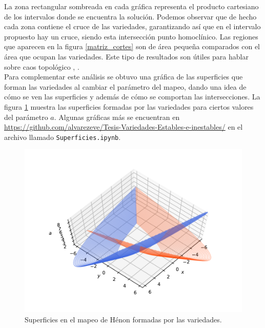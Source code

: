 


La zona rectangular sombreada en cada gráfica representa el producto cartesiano de los intervalos donde se encuentra la solución. Podemos observar que de hecho cada zona contiene el cruce de las variedades, garantizando así que en el intervalo propuesto hay un cruce, siendo esta intersección punto homoclínico. Las regiones que aparecen en la figura \ref{matriz_cortes} son de área pequeña comparados con el área que ocupan las variedades. Este tipo de resultados son útiles para hablar sobre caos topológico \cite{devaney}, \cite{gerald}.\\

Para complementar este análisis se obtuvo una gráfica de las superficies que forman las variedades al cambiar el parámetro del mapeo, dando una idea de cómo se ven las superficies y además de cómo se comportan las intersecciones. La figura \ref{SuperficiesH} muestra las superficies formadas por las variedades para ciertos valores del parámetro $a$. Algunas gráficas más se encuentran en  \url{https://github.com/alvarezeve/Tesis-Variedades-Estables-e-inestables/} en el archivo llamado \texttt{Superficies.ipynb}.
\begin{figure}[H]
\centering
\includegraphics[scale=0.9]{HenonV}
\caption{Superficies en el mapeo de Hénon formadas por las variedades.}
\label{SuperficiesH}
\end{figure}



